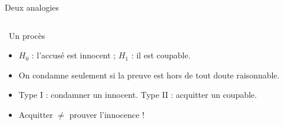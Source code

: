 \documentclass{BeamerTemplate}
\begin{document}
\begin{frame}[t]{Deux analogies}
  \vspace{-3mm}
  \begin{columns}[T]
      \begin{Boite}{\faBalanceScale\ Un procès}
        \small
        \begin{itemize}\itemsep 1mm
          \item $H_0$ : l'accusé est innocent ; $H_1$ : il est coupable.
          \item On condamne seulement si la preuve est \alert{hors de tout doute raisonnable}.
          \item Type I : condamner un innocent. Type II : acquitter un coupable.
          \item Acquitter $\ne$ prouver l'innocence !
        \end{itemize}
      \end{Boite}

  \end{columns}
\end{frame}
\end{document}
